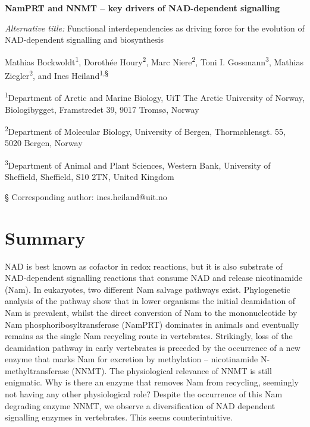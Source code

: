 \documentclass[paper=a4, 12pt]{scrartcl}
\begin{document}
\noindent
{\huge\sffamily\bfseries NamPRT and NNMT – key drivers of NAD-dependent signalling \par}

\vspace{15mm}

\noindent
\textit{Alternative title:} Functional interdependencies as driving force for the evolution of NAD-dependent signalling and biosynthesis

\vspace{5mm}

\noindent
Mathias Bockwoldt\textsuperscript{1}, Dorothée Houry\textsuperscript{2}, Marc Niere\textsuperscript{2}, Toni I. Gossmann\textsuperscript{3}, Mathias Ziegler\textsuperscript{2}, and Ines Heiland\textsuperscript{1,§}

\vspace{1cm}

\noindent
\textsuperscript{1}Department of Arctic and Marine Biology, UiT The Arctic University of Norway, Biologibygget, Framstredet 39, 9017 Tromsø, Norway

\noindent
\textsuperscript{2}Department of Molecular Biology, University of Bergen, Thormøhlensgt. 55, 5020 Bergen, Norway

\noindent
\textsuperscript{3}Department of Animal and Plant Sciences, Western Bank, University of Sheffield, Sheffield, S10 2TN, United Kingdom

\noindent
§ Corresponding author: ines.heiland@uit.no


\section*{Summary}

NAD is best known as cofactor in redox reactions, but it is also substrate of NAD-dependent signalling reactions that consume NAD and release nicotinamide (Nam). In eukaryotes, two different Nam salvage pathways exist. Phylogenetic analysis of the pathway show that in lower organisms the initial deamidation of Nam is prevalent, whilst the direct conversion of Nam to the mononucleotide by Nam phosphoribosyltransferase (NamPRT) dominates in animals and eventually remains as the single Nam recycling route in vertebrates. Strikingly, loss of the deamidation pathway in early vertebrates is preceded by the occurrence of a new enzyme that marks Nam for excretion by methylation – nicotinamide N-methyltransferase (NNMT). The physiological relevance of NNMT is still enigmatic. Why is there an enzyme that removes Nam from recycling, seemingly not having any other physiological role? Despite the occurrence of this Nam degrading enzyme NNMT, we observe a diversification of NAD dependent signalling enzymes in vertebrates. This seems counterintuitive.
\end{document}
